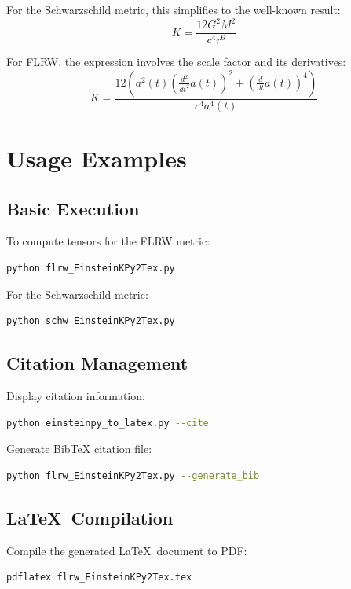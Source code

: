 \documentclass[11pt,a4paper]{article}
\begin{document}
For the Schwarzschild metric, this simplifies to the well-known result:
\begin{equation}
K = \frac{12 G^2 M^2}{c^4 r^6}
\end{equation}

For FLRW, the expression involves the scale factor and its derivatives:
\begin{equation}
K = \frac{12 \left(a^{2}{\left(t \right)} \left(\frac{d^{2}}{d t^{2}} a{\left(t \right)}\right)^{2} + \left(\frac{d}{d t} a{\left(t \right)}\right)^{4}\right)}{c^{4} a^{4}{\left(t \right)}}
\end{equation}

\section{Usage Examples}

\subsection{Basic Execution}

To compute tensors for the FLRW metric:
\begin{lstlisting}[language=bash]
python flrw_EinsteinKPy2Tex.py
\end{lstlisting}

For the Schwarzschild metric:
\begin{lstlisting}[language=bash]
python schw_EinsteinKPy2Tex.py
\end{lstlisting}

\subsection{Citation Management}

Display citation information:
\begin{lstlisting}[language=bash]
python einsteinpy_to_latex.py --cite
\end{lstlisting}

Generate BibTeX citation file:
\begin{lstlisting}[language=bash]
python flrw_EinsteinKPy2Tex.py --generate_bib
\end{lstlisting}

\subsection{\LaTeX\ Compilation}

Compile the generated \LaTeX\ document to PDF:
\begin{lstlisting}[language=bash]
pdflatex flrw_EinsteinKPy2Tex.tex
\end{lstlisting}
\end{document}
